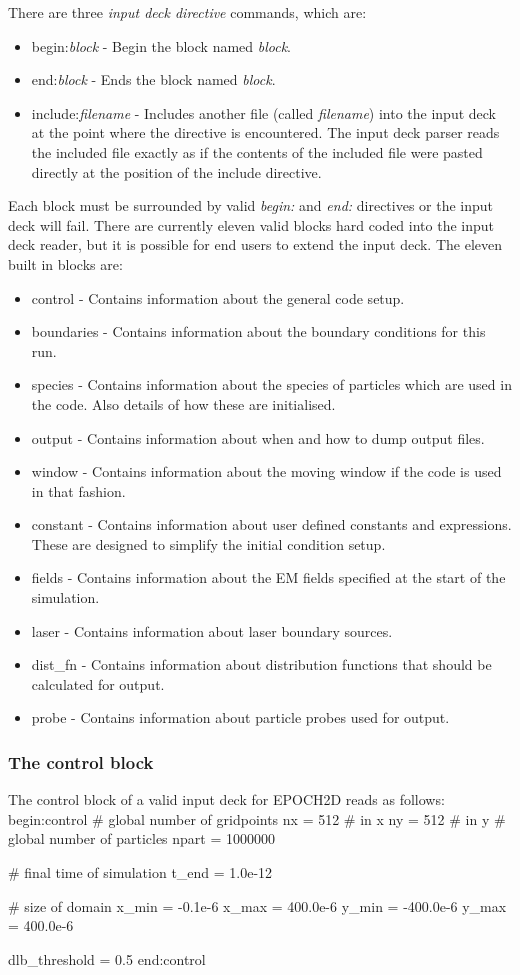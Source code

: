 \documentclass[12pt,a4paper]{article}
\newenvironment{boxverbatim}{\lboxverbatim{none}}{\endlboxverbatim}
\begin{document}
There are three {\it input deck directive} commands, which are:
\begin{itemize}
\item begin:{\it block} - Begin the block named {\it block}.
\item end:{\it block} - Ends the block named {\it block}.
\item include:{\it filename} - Includes another file (called {\it filename})
  into the input deck at the point where the directive is encountered. The
  input deck parser reads the included file exactly as if the contents of the
  included file were pasted directly at the position of the include directive.
\end{itemize}
Each block must be surrounded by valid {\it begin:} and {\it end:} directives
or the input deck will fail. There are currently eleven valid blocks hard
coded into the input deck reader, but it is possible for end users to extend
the input deck. The eleven built in blocks are:
\begin{itemize}
\item control - Contains information about the general code setup.
\item boundaries - Contains information about the boundary conditions for this
  run.
\item species - Contains information about the species of particles which are
  used in the code. Also details of how these are initialised.
\item output - Contains information about when and how to dump output files.
\item window - Contains information about the moving window if the code is
  used in that fashion.
\item constant - Contains information about user defined constants and
  expressions. These are designed to simplify the initial condition setup.
\item fields - Contains information about the EM fields specified at the
  start of the simulation.
\item laser - Contains information about laser boundary sources.
\item dist\_fn - Contains information about distribution functions that should
  be calculated for output.
\item probe - Contains information about particle probes used for output.
\end{itemize}

\subsubsection{The control block}
The control block of a valid input deck for EPOCH2D reads as follows:
\begin{boxverbatim}
begin:control
   # global number of gridpoints
   nx = 512 # in x
   ny = 512 # in y
   # global number of particles
   npart = 1000000

   # final time of simulation
   t_end = 1.0e-12

   # size of domain
   x_min = -0.1e-6
   x_max = 400.0e-6
   y_min = -400.0e-6
   y_max = 400.0e-6

   dlb_threshold = 0.5
end:control
\end{boxverbatim}
\end{document}
